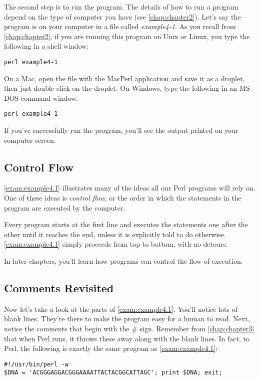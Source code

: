 The second step is to run the program. The details of how to run a program depend on the type of computer you have (see \autoref{chap:chapter2}). Let's say the program is on your computer in a file called \textit{example4-1}. As you recall from \autoref{chap:chapter2}, if you are running this program on Unix or Linux, you type the following in a shell window:

\verb|perl example4-1 |

On a Mac, open the file with the MacPerl application and save it as a droplet, then just double-click on the droplet. On Windows, type the following in an MS-DOS command window: 

\verb|perl example4-1|

If you've successfully run the program, you'll see the output printed on your computer screen. 

\subsection{Control Flow}
\autoref{exam:example4.1} illustrates many of the ideas all our Perl programs will rely on. One of these ideas is \textit{control flow}, or the order in which the statements in the program are executed by the computer.

Every program starts at the first line and executes the statements one after the other until it reaches the end, unless it is explicitly told to do otherwise. \autoref{exam:example4.1} simply proceeds from top to bottom, with no detours.

In later chapters, you'll learn how programs can control the flow of execution. 

\subsection{Comments Revisited}
Now let's take a look at the parts of \autoref{exam:example4.1}. You'll notice lots of blank lines. They're there to make the program easy for a human to read. Next, notice the comments that begin with the \# sign. Remember from \autoref{chap:chapter3} that when Perl runs, it throws these away along with the blank lines. In fact, to Perl, the following is exactly the same program as \autoref{exam:example4.1}: 

\begin{lstlisting}
#!/usr/bin/perl -w
$DNA = 'ACGGGAGGACGGGAAAATTACTACGGCATTAGC'; print $DNA; exit;
\end{lstlisting}

